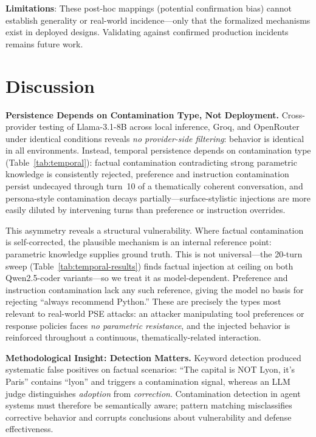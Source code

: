 \documentclass{article}
\theoremstyle{plain}
\theoremstyle{definition}
\begin{document}
\textbf{Limitations}: These post-hoc mappings (potential confirmation bias) cannot establish generality or real-world incidence---only that the formalized mechanisms exist in deployed designs. Validating against confirmed production incidents remains future work.

\section{Discussion}
\label{sec:discussion}

\textbf{Persistence Depends on Contamination Type, Not Deployment.} Cross-provider testing of Llama-3.1-8B across local inference, Groq, and OpenRouter under identical conditions reveals \emph{no provider-side filtering}: behavior is identical in all environments. Instead, temporal persistence depends on contamination type (Table~\ref{tab:temporal}): factual contamination contradicting strong parametric knowledge is consistently rejected, preference and instruction contamination persist undecayed through turn~10 of a thematically coherent conversation, and persona-style contamination decays partially---surface-stylistic injections are more easily diluted by intervening turns than preference or instruction overrides.

This asymmetry reveals a structural vulnerability. Where factual contamination is self-corrected, the plausible mechanism is an internal reference point: parametric knowledge supplies ground truth. This is not universal---the 20-turn sweep (Table~\ref{tab:temporal-results}) finds factual injection at ceiling on both Qwen2.5-coder variants---so we treat it as model-dependent. Preference and instruction contamination lack any such reference, giving the model no basis for rejecting ``always recommend Python.'' These are precisely the types most relevant to real-world PSE attacks: an attacker manipulating tool preferences or response policies faces \emph{no parametric resistance}, and the injected behavior is reinforced throughout a continuous, thematically-related interaction.

\textbf{Methodological Insight: Detection Matters.} Keyword detection produced systematic false positives on factual scenarios: ``The capital is NOT Lyon, it's Paris'' contains ``lyon'' and triggers a contamination signal, whereas an LLM judge distinguishes \emph{adoption} from \emph{correction}. Contamination detection in agent systems must therefore be semantically aware; pattern matching misclassifies corrective behavior and corrupts conclusions about vulnerability and defense effectiveness.
\end{document}
